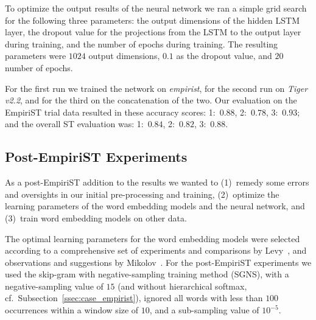 \documentclass[11pt]{article}
\begin{document}
To optimize the output results of the neural network we ran a simple grid
search for the following three parameters: the output dimensions of the hidden
LSTM layer, the dropout value for the projections from the LSTM to the output
layer during training, and the number of epochs during training. The resulting
parameters were $1024$ output dimensions, $0.1$ as the dropout value, and $20$
number of epochs.

For the first run we trained the network on \emph{empirist}, for the second run
on \emph{Tiger v2.2}, and for the third on the concatenation of the two. %
Our evaluation on the EmpiriST trial data resulted in these accuracy scores:
1:~$0.88$, 
2:~$0.78$, 
3:~$0.93$;
and the overall ST evaluation was:
1:~$0.84$,
2:~$0.82$,
3:~$0.88$.

\subsection{Post-EmpiriST Experiments}
\label{ssec:case_postempirist}
As a post-EmpiriST addition to the results we wanted to (1)~remedy some errors
and oversights in our initial pre-processing and training, (2)~optimize the
learning parameters of the word embedding models and the neural network, and
(3)~train word embedding models on other data.

The optimal learning parameters for the word embedding models were selected
according to a comprehensive set of experiments and comparisons by
Levy~, and observations and suggestions by
Mikolov~. 
For the post-EmpiriST experiments we used the skip-gram with negative-sampling
training method (SGNS), with a negative-sampling value of $15$ (and without
hierarchical softmax, cf.~Subsection~\ref{ssec:case_empirist}), ignored all
words with less than $100$ occurrences within a window size of $10$, and a
sub-sampling value of $10^{-5}$. 
\end{document}
